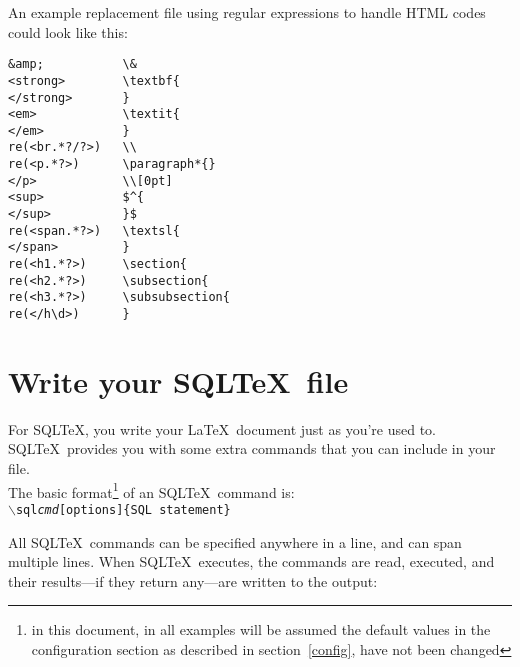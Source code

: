 \documentclass{article}
\newcommand{\bs}{\ensuremath{\backslash}}
\newcommand{\vs}{\vspace{3mm}}
\begin{document}
An example replacement file using regular expressions to handle HTML codes could look like this:

\noindent\begin{verbatim}
&amp;           \&
<strong>        \textbf{
</strong>       }
<em>            \textit{
</em>           }
re(<br.*?/?>)   \\
re(<p.*?>)      \paragraph*{}
</p>            \\[0pt]
<sup>           $^{
</sup>          }$
re(<span.*?>)   \textsl{
</span>         }
re(<h1.*?>)     \section{
re(<h2.*?>)     \subsection{
re(<h3.*?>)     \subsubsection{
re(</h\d>)      }
\end{verbatim}

\section{Write your SQL\TeX\ file}

For SQL\TeX, you write your \LaTeX\ document just as you're used to. SQL\TeX\ provides you with
some extra commands that you can include in your file.\\
The basic format\footnote{in this document, in all examples will be assumed the default values in the
configuration section as described in section~\ref{config}, have not been changed} of an SQL\TeX\ command is: \\
\texttt{\bs sql\emph{cmd}[options]\{SQL statement\}}

\vs

All SQL\TeX\ commands can be specified anywhere in a line, and can span multiple lines.
When SQL\TeX\ executes, the commands are read, executed, and their results---if they return
any---are written to the output:

\vs
\end{document}
